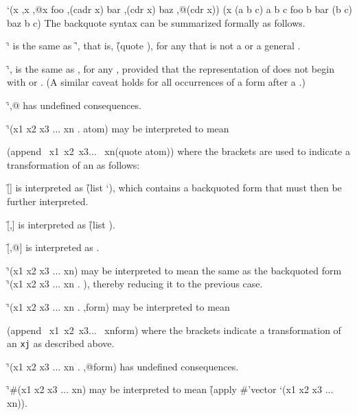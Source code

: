 \code
 `(x ,x ,@x foo ,(cadr x) bar ,(cdr x) baz ,@(cdr x))
\EV (x (a b c) a b c foo b bar (b c) baz b c)
\endcode
The backquote syntax can be summarized formally as follows.

\beginlist
\itemitem{\bull}
\f{`} is the same as \f{'},
that is, \f{(quote )}, for any  
 that is not a  or a general .

\itemitem{\bull}
\f{`,} is the same as , for any , provided
that the representation of  does not begin with 
or .  (A similar caveat holds for all occurrences of a form after a .)

\itemitem{\bull}
\f{`,@} has undefined consequences.

\itemitem{\bull}
\f{`(x1 x2 x3 ... xn . atom)}
may be interpreted to mean

\code
 (append \lbracket\ x1\rbracket \lbracket\ x2\rbracket \lbracket\ x3\rbracket ... \lbracket\ xn\rbracket (quote atom))
\endcode
where the brackets are used to indicate
a transformation of an  as follows:

\beginlist
\itemitem{--}
\f{[]} is interpreted as \f{(list `)}, 
which contains a backquoted form that must then be further interpreted.

\itemitem{--}
\f{[,]} is interpreted as \f{(list )}.

\itemitem{--}
\f{[,@]} is interpreted as .
\endlist

\itemitem{\bull}
\f{`(x1 x2 x3 ... xn)} may be interpreted to mean
the same as the backquoted form
\f{`(x1 x2 x3 ... xn . \nil)},
thereby reducing it to the previous case.

\itemitem{\bull}
\f{`(x1 x2 x3 ... xn . ,form)} may be interpreted to mean

\code
 (append \lbracket\ x1\rbracket \lbracket\ x2\rbracket \lbracket\ x3\rbracket ... \lbracket\ xn\rbracket form)
\endcode
where the brackets indicate a transformation of an {\tt xj} as described above.

\itemitem{\bull}
\f{`(x1 x2 x3 ... xn . ,@form)} has undefined consequences.

\itemitem{\bull}
\f{`\#(x1 x2 x3 ... xn)} may be interpreted to mean
\f{(apply \#'vector `(x1 x2 x3 ... xn))}.
\endlist


